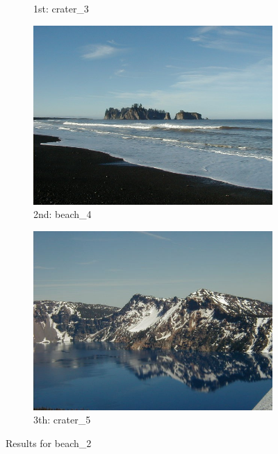 \begin{itemize}
\begin{figure}[H]
\begin{subfigure}{0.25\textwidth}
	  \caption{1st: crater\_3}
	\end{subfigure}%
	\begin{subfigure}{0.25\textwidth}
        \centering
        \includegraphics[width=0.9\linewidth]{../input/beach_4.jpg}
        \caption{2nd: beach\_4}
    \end{subfigure}%
    \begin{subfigure}{0.25\textwidth}
	  \centering
	  \includegraphics[width=0.9\linewidth]{../input/crater_5.jpg}
	    \caption{3th: crater\_5}
	\end{subfigure}
    \caption{Results for beach\_2}
    \label{fig:results_beach_2}
\end{figure}


\end{itemize}
